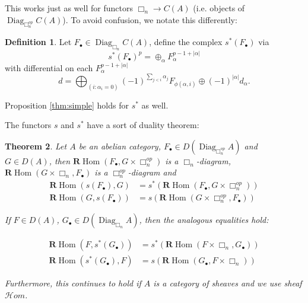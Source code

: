 \documentclass{report}
\newtheorem{theorem}{Theorem}[section]
\theoremstyle{definition}
\newtheorem{definition}[theorem]{Definition}
\DeclareMathOperator{\Diag}{Diag}
\DeclareMathOperator{\Hom}{Hom}
\newcommand{\cHom}{\mathcal{H} \textit{om}}
\newcommand{\bR}{\textbf{R}}
\begin{document}
This works just as well for functors $\Box_n \rightarrow C(A)$ (i.e. objects of $\Diag_{\Box_n^{op}} C(A)$).
To avoid confusion, we notate this differently:
\begin{definition}
	Let $F_\bullet \in \Diag_{\Box_n} C(A)$, define the complex $s^*(F_\bullet)$ via
	\[
		s^*(F_\bullet)^p = \oplus_\alpha F_\alpha^{p-1+|\alpha|}
	\]
	with differential on each $F_\alpha^{p-1+|\alpha|}$
	\[
		d = \bigoplus_{(i : \alpha_i = 0)} (-1)^{\sum_{j < i} \alpha_j} F_{\phi(\alpha,i)} \oplus (-1)^{|\alpha|} d_\alpha.
	\]
	
	Proposition \ref{thm:simple} holds for $s^*$ as well.
\end{definition}

The functors $s$ and $s^*$ have a sort of duality theorem:

\begin{theorem}
	\label{thm:simpleduality}
	Let $A$ be an abelian category, $F_\bullet \in D(\Diag_{\Box_n^{op}} A)$ and $G \in D(A)$, then $\bR \Hom(F_\bullet, G \times \Box_n^{op})$ is a $\Box_n$-diagram, $\bR \Hom(G \times \Box_n, F_\bullet)$ is a $\Box_n^{op}$-diagram and
	\begin{align*}
		\bR \Hom(s(F_\bullet), G) &= s^* (\bR \Hom(F_\bullet, G \times \Box_n^{op})) \\
		\bR \Hom(G, s(F_\bullet)) &= s (\bR \Hom(G \times \Box_n^{op}, F_\bullet))
	\end{align*}
	
	If $F \in D(A)$, $G_\bullet \in D(\Diag_{\Box_n} A)$, then the analogous equalities hold:
	
	\begin{align*}
		\bR \Hom(F, s^* (G_\bullet)) &= s^* (\bR \Hom(F \times \Box_n, G_\bullet)) \\
		\bR \Hom(s^*(G_\bullet), F) &= s(\bR \Hom(G_\bullet, F \times \Box_n))
	\end{align*}
	
	Furthermore, this continues to hold if $A$ is a category of sheaves and we use sheaf $\cHom$.
\end{theorem}
\end{document}
